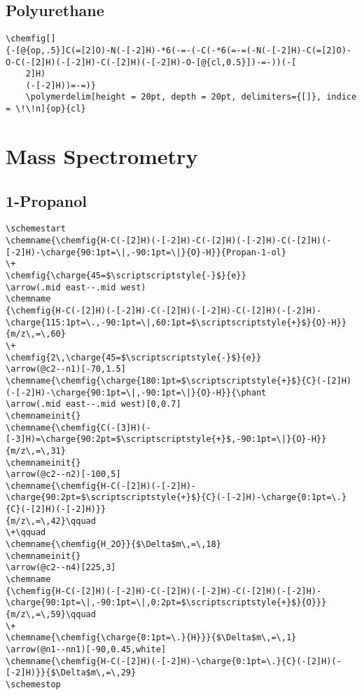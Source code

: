 \section{Polyurethane}\label{app:polyurethane}
\begin{lstlisting}
\chemfig[]
{-[@{op,.5}]C(=[2]O)-N(-[-2]H)-*6(-=-(-C(-*6(=-=(-N(-[-2]H)-C(=[2]O)-O-C(-[2]H)(-[-2]H)-C(-[2]H)(-[-2]H)-O-[@{cl,0.5}])-=-))(-[
    2]H)
    (-[-2]H))=-=)}
    \polymerdelim[height = 20pt, depth = 20pt, delimiters={[]}, indice = \!\!n]{op}{cl}
\end{lstlisting}


\chapter{Mass Spectrometry}\label{app:mass-spectrometry}


\section{1-Propanol}\label{app:1-propanol}
\begin{footnotesize}
    \begin{lstlisting}
\schemestart
\chemname{\chemfig{H-C(-[2]H)(-[-2]H)-C(-[2]H)(-[-2]H)-C(-[2]H)(-[-2]H)-\charge{90:1pt=\|,-90:1pt=\|}{O}-H}}{Propan-1-ol}
\+
\chemfig{\charge{45=$\scriptscriptstyle{-}$}{e}}
\arrow(.mid east--.mid west)
\chemname
{\chemfig{H-C(-[2]H)(-[-2]H)-C(-[2]H)(-[-2]H)-C(-[2]H)(-[-2]H)-\charge{115:1pt=\.,-90:1pt=\|,60:1pt=$\scriptscriptstyle{+}$}{O}-H}}
{m/z\,=\,60}
\+
\chemfig{2\,\charge{45=$\scriptscriptstyle{-}$}{e}}
\arrow(@c2--n1)[-70,1.5]
\chemname{\chemfig{\charge{180:1pt=$\scriptscriptstyle{+}$}{C}(-[2]H)(-[-2]H)-\charge{90:1pt=\|,-90:1pt=\|}{O}-H}}{\phant
\arrow(.mid east--.mid west)[0,0.7]
\chemnameinit{}
\chemname{\chemfig{C(-[3]H)(-[-3]H)=\charge{90:2pt=$\scriptscriptstyle{+}$,-90:1pt=\|}{O}-H}}{m/z\,=\,31}
\chemnameinit{}
\arrow(@c2--n2)[-100,5]
\chemname{\chemfig{H-C(-[2]H)(-[-2]H)-\charge{90:2pt=$\scriptscriptstyle{+}$}{C}(-[-2]H)-\charge{0:1pt=\.}{C}(-[2]H)(-[-2]H)}}
{m/z\,=\,42}\qquad
\+\qquad
\chemname{\chemfig{H_2O}}{$\Delta$m\,=\,18}
\chemnameinit{}
\arrow(@c2--n4)[225,3]
\chemname
{\chemfig{H-C(-[2]H)(-[-2]H)-C(-[2]H)(-[-2]H)-C(-[2]H)(-[-2]H)-\charge{90:1pt=\|,-90:1pt=\|,0:2pt=$\scriptscriptstyle{+}$}{O}}}
{m/z\,=\,59}\qquad
\+
\chemname{\chemfig{\charge{0:1pt=\.}{H}}}{$\Delta$m\,=\,1}
\arrow(@n1--nn1)[-90,0.45,white]
\chemname{\chemfig{H-C(-[2]H)(-[-2]H)-\charge{0:1pt=\.}{C}(-[2]H)(-[-2]H)}}{$\Delta$m\,=\,29}
\schemestop
    \end{lstlisting}
\end{footnotesize}

